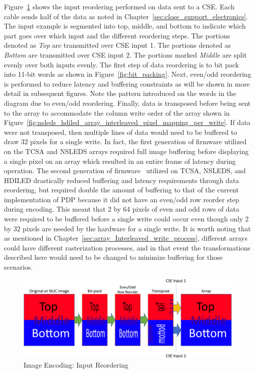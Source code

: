     Figure~\ref{fig:image_encoding} shows the input reordering performed on data sent to a CSE. Each cable sends half of the data as noted in Chapter~\ref{sec:close_support_electronics}. The input example is segmented into top, middle, and bottom to indicate which part goes over which input and the different reordering steps. The portions denoted as {\it Top} are transmitted over CSE input 1. The portions denoted as {\it Bottom} are transmitted over CSE input 2. The portions marked {\it Middle} are split evenly over both inputs evenly. The first step of data reordering is to bit pack into 11-bit words as shown in Figure~\ref{fig:bit_packing}. Next, even/odd reordering is performed to reduce latency and buffering constraints as will be shown in more detail in subsequent figures. Note the pattern introduced on the words in the diagram due to even/odd reordering. Finally, data is transposed before being sent to the array to accommodate the column write order of the array shown in Figure~\ref{fig:nsleds_hdiled_array_interleaved_pixel_mapping_per_write}. If data were not transposed, then multiple lines of data would need to be buffered to draw 32 pixels for a single write. In fact, the first generation of firmware utilized on the TCSA and NSLEDS arrays required full image buffering before displaying a single pixel on an array which resulted in an entire frame of latency during operation. The second generation of firmware~\cite{HouserEtAl2018} utilized on TCSA, NSLEDS, and HDILED drastically reduced buffering and latency requirements through data reordering, but
    required double the amount of buffering to that of the current implementation of PDP because it did not have an even/odd row reorder step during encoding. This meant that 2 by 64 pixels of even and odd rows of data were required to be buffered before a single write could occur even though only 2 by 32 pixels are needed by the hardware for a single write. It is worth noting that as mentioned in Chapter~\ref{sec:array_Interleaved_write_process}, different arrays could have different rasterization processes, and in that event the transformations described here would need to be changed to minimize buffering for those scenarios.

    \begin{figure}
        \centering
        \includegraphics[width=1.0\textwidth]{fig/image_encoding.pdf}
        \caption{Image Encoding: Input Reordering}
        \label{fig:image_encoding}
    \end{figure}

